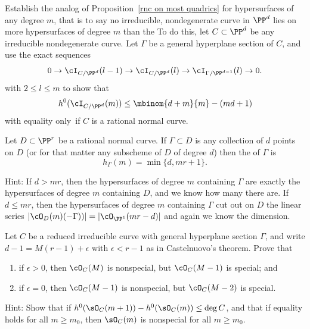 \begin{exercise}\label{extremal m-ics}
Establish the analog of Proposition~\ref{rnc on most quadrics}
for hypersurfaces of any degree $m$, that is to say no irreducible,
nondegenerate curve in $\PP^d$ lies on more hypersurfaces of degree $m$
than the 
%
To do this, let $C\subset \PP^d$ be any irreducible nondegenerate
curve. Let $\Gamma$ be a general hyperplane section
of $C$, and use the exact sequences
$$
0 \to \cI_{C/\PP^d}(l-1) \to \cI_{C/\PP^d}(l) \to
\cI_{\Gamma/\PP^{d-1}}(l) \to 0.
$$
with $2 \leq l \leq m$ to show that
$$
h^0(\cI_{C/\PP^d}(m)) \leq  \mbinom{d+m}{m} - (md+1)
$$
with equality only~if $C$ is a rational normal curve.
\end{exercise}

\begin{exercise}\label{linear bound is sharp}
Let $D \subset \PP^r$ be a rational normal curve. If $\Gamma \subset D$
is any collection of $d$ points on $D$ (or for that matter any subscheme
of $D$ of degree $d$) then the 
%
of $\Gamma$ is
$$
h_\Gamma(m) = \min\{d, mr+1\}
.
$$

Hint: If $d > mr$, then the hypersurfaces of degree $m$ containing
$\Gamma$ are exactly the hypersurfaces of degree $m$ containing $D$,
and we know how many there are. If $d \leq mr$, then the hypersurfaces
of degree $m$ containing $\Gamma$ cut out on $D$ the linear series
$|\cO_D(m)(-\Gamma))| = |\cO_{\PP^1}(mr-d)|$ and again we know the
dimension.
\end{exercise}

\begin{exercise}
Let $C$ be a reduced irreducible curve with general hyperplane section
$\Gamma$,
and write
$d-1 = M(r-1) +\epsilon$ with $\epsilon<r-1$ as in Castelnuovo's theorem.
Prove that
\begin{enumerate}
\item if $\epsilon > 0$, then $\cO_C(M)$ is nonspecial, but $\cO_C(M-1)$
is special; and
\item if $\epsilon = 0$, then $\cO_C(M-1)$ is nonspecial, but $\cO_C(M-2)$
%
is special.
\end{enumerate}

Hint: Show that if $h^{0}(\sO_{C}(m+1))-h^{0}(\sO_{C}(m)) \leq \deg C$,
and that if equality holds for
all $m\geq m_{0}$, then $\sO_{C}(m) $ is nonspecial for all $m\geq m_{0}$.
\end{exercise}

